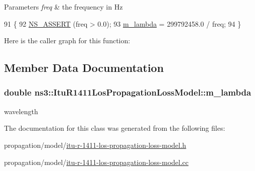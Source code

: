 \begin{DoxyParams}{Parameters}
{\em freq} & the frequency in Hz \\
\hline
\end{DoxyParams}

\begin{DoxyCode}
91 \{
92   \hyperlink{assert_8h_a6dccdb0de9b252f60088ce281c49d052}{NS\_ASSERT} (freq > 0.0);
93   \hyperlink{classns3_1_1ItuR1411LosPropagationLossModel_a86fc083a1850204ea9dfbde06c226c5e}{m\_lambda} = 299792458.0 / freq;
94 \}
\end{DoxyCode}


Here is the caller graph for this function\+:




\subsection{Member Data Documentation}
\subsubsection[{\texorpdfstring{m\+\_\+lambda}{m_lambda}}]{\setlength{\rightskip}{0pt plus 5cm}double ns3\+::\+Itu\+R1411\+Los\+Propagation\+Loss\+Model\+::m\+\_\+lambda\hspace{0.3cm}{\ttfamily [private]}}\hypertarget{classns3_1_1ItuR1411LosPropagationLossModel_a86fc083a1850204ea9dfbde06c226c5e}{}\label{classns3_1_1ItuR1411LosPropagationLossModel_a86fc083a1850204ea9dfbde06c226c5e}


wavelength 



The documentation for this class was generated from the following files\+:\begin{DoxyCompactItemize}
\item 
propagation/model/\hyperlink{itu-r-1411-los-propagation-loss-model_8h}{itu-\/r-\/1411-\/los-\/propagation-\/loss-\/model.\+h}\item 
propagation/model/\hyperlink{itu-r-1411-los-propagation-loss-model_8cc}{itu-\/r-\/1411-\/los-\/propagation-\/loss-\/model.\+cc}\end{DoxyCompactItemize}
